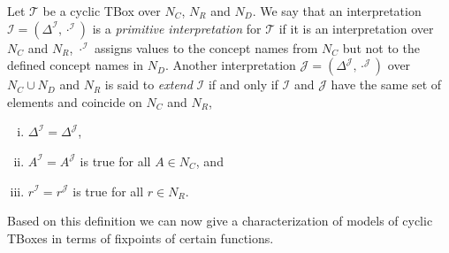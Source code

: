 \begin{Definition}
  \label{def:primite-interpretations-and-extentions}
  Let $\mathcal{T}$ be a cyclic TBox over $N_C$, $N_R$ and $N_D$.  We say that an
  interpretation $\mathcal{I} = (\Delta^{\mathcal{I}}, \cdot^{\mathcal{I}})$ is a
  \emph{primitive interpretation} for $\mathcal{T}$ if it is an interpretation over $N_C$
  and $N_R$, \ie $\cdot^{\mathcal{I}}$ assigns values to the concept names from $N_C$ but
  not to the defined concept names in $N_D$.  Another interpretation $\mathcal{J} =
  (\Delta^{\mathcal{J}}, \cdot^{\mathcal{J}})$ over $N_C \cup N_D$ and $N_R$ is said to
  \emph{extend} $\mathcal{I}$ if and only if $\mathcal{I}$ and $\mathcal{J}$ have the same
  set of elements and coincide on $N_C$ and $N_R$, \ie
  \begin{enumerate}[i. ]
  \item $\Delta^{\mathcal{I}} = \Delta^{\mathcal{J}}$,
  \item $A^{\mathcal{I}} = A^{\mathcal{J}}$ is true for all $A \in N_C$, and
  \item $r^{\mathcal{I}} = r^{\mathcal{J}}$ is true for all $r \in N_R$.
  \end{enumerate}
\end{Definition}

Based on this definition we can now give a characterization of models of cyclic TBoxes in
terms of fixpoints of certain functions.

